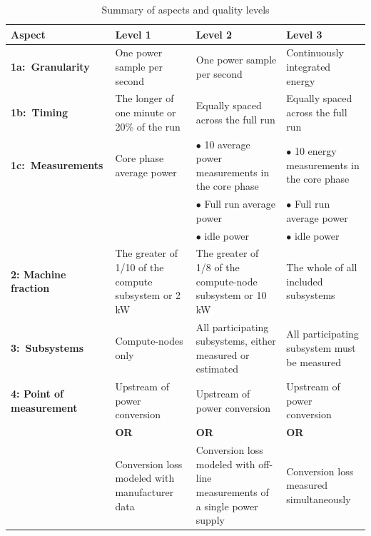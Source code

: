 \noindent
\begin{table}
\caption{Summary of aspects and quality levels}
\label{tab:levels}
\begin{tabular}{|p{3.0cm}|p{3.5cm}|p{3.5cm}|p{3.5cm}|} \hline
\textbf{Aspect}&\textbf{Level 1}&\textbf{Level 2}&\textbf{Level 3}\\ \hline

\textbf{1a:~Granularity} &
One power sample per second &
One power sample per second &
Continuously integrated energy\\
\hline


\textbf{1b:~Timing} &
The longer of one minute or 20\% of the run &
Equally spaced across the full run &
Equally spaced across the full run   \\
\hline

\textbf{1c:~Measurements} &
Core phase average power &
$\bullet$ 10 average power measurements in the core phase &
$\bullet$  10 energy measurements in the core phase\\

 & &
$\bullet$  Full run average power &
$\bullet$  Full run average power \\

 & &
$\bullet$  idle power &
$\bullet$  idle power \\
\hline

\textbf{2: Machine \newline fraction}  &
The greater of 1/10 of the compute subsystem or 2 kW  &
The greater of 1/8 of the compute-node subsystem or 10 kW  &
The whole of all included subsystems \\
\hline

\textbf{3:~Subsystems} &
Compute-nodes only &
All participating subsystems, either measured or estimated &
All participating subsystem must be measured \\
\hline

\textbf{4: Point of measurement} &
Upstream of power conversion &
Upstream of power conversion &
Upstream of power conversion\\

 &
\centering \textbf{OR} &
\centering \textbf{OR} &
\centering \textbf{OR} \tabularnewline

 &
Conversion loss modeled with manufacturer data &
Conversion loss modeled with off-line measurements of a single power supply &
Conversion loss measured simultaneously \\
\hline
\end{tabular}
\end{table}

